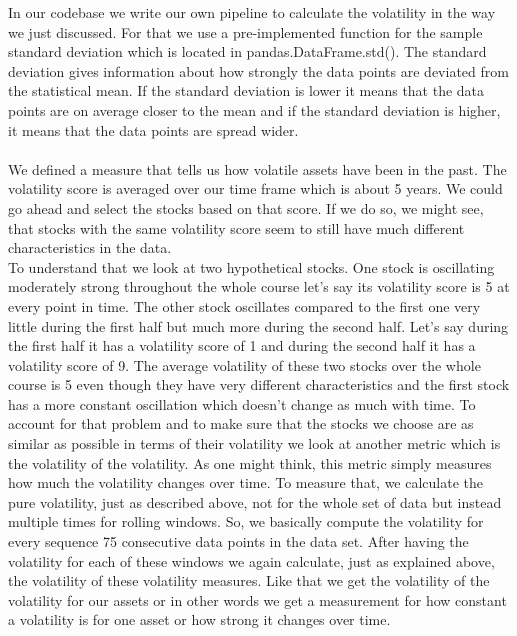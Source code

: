 \documentclass[a4paper,12pt]{report}
\begin{document}
In our codebase we write our own pipeline to calculate the volatility in the way we just discussed. For that we use a pre-implemented function for the sample standard deviation which is located in pandas.DataFrame.std(). The standard deviation gives information about how strongly the data points are deviated from the statistical mean. If the standard deviation is lower it means that the data points are on average closer to the mean and if the standard deviation is higher, it means that the data points are spread wider.\\\\
We defined a measure that tells us how volatile assets have been in the past. The volatility score is averaged over our time frame which is about 5 years. We could go ahead and select the stocks based on that score. If we do so, we might see, that stocks with the same volatility score seem to still have much different characteristics in the data. \\
To understand that we look at two hypothetical stocks. One stock is oscillating moderately strong throughout the whole course let’s say its volatility score is 5 at every point in time. The other stock oscillates compared to the first one very little during the first half but much more during the second half. Let’s say during the first half it has a volatility score of 1 and during the second half it has a volatility score of 9. The average volatility of these two stocks over the whole course is 5 even though they have very different characteristics and the first stock has a more constant oscillation which doesn’t change as much with time. To account for that problem and to make sure that the stocks we choose are as similar as possible in terms of their volatility we look at another metric which is the volatility of the volatility. As one might think, this metric simply measures how much the volatility changes over time. To measure that, we calculate the pure volatility, just as described above, not for the whole set of data but instead multiple times for rolling windows. So, we basically compute the volatility for every sequence 75 consecutive data points in the data set. After having the volatility for each of these windows we again calculate, just as explained above, the volatility of these volatility measures. Like that we get the volatility of the volatility for our assets or in other words we get a measurement for how constant a volatility is for one asset or how strong it changes over time.\\\\
\end{document}
